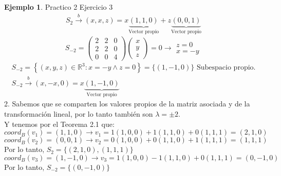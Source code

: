 \documentclass[10pt]{article}
\theoremstyle{definition}
\newtheorem{example}{Ejemplo}[section]
\begin{document}
\begin{example}{Practico 2 Ejercicio 3}
$$\begin{array}{l}
			S_{2}\xrightarrow{b}( x,x,z) =x\underbrace{( 1,1,0)}_{\text{Vector propio}} +z\underbrace{( 0,0,1)}_{\text{Vector propio}}
		\end{array}$$
	$$S_{-2} =\begin{pmatrix}
			2 & 2 & 0 \\
			2 & 2 & 0 \\
			0 & 0 & 4
		\end{pmatrix}\begin{pmatrix}
			x \\
			y \\
			z
		\end{pmatrix} =0\rightarrow \begin{matrix}
			z=0 \\
			x=-y
		\end{matrix}$$
	$$ \begin{array}{l}
			S_{-2} =\left\{( x,y,z) \in \mathbb{R}^{3}  : x=-y\land z=0\right\}=\{\left( 1,-1,0 \right) \} \text{ Subespacio propio.} \\
			S_{-2}\xrightarrow{b}( x,-x,0) =x\underbrace{( 1,-1,0)}_{\text{Vector propio}}
		\end{array}$$
	2. Sabemos que se comparten los valores propios de la matriz asociada y de la transformación lineal, por lo tanto también son $\lambda =\pm 2$.\\
	Y tenemos por el Teorema 2.1 que:\\
	$coord_B(v_1)=\left( 1,1,0 \right) \rightarrow v_1=1\left( 1,0,0 \right) + 1(1,1,0)+0\left( 1,1,1 \right)=(2,1,0)  $\\
	$coord_B(v_2)=(0,0,1)\rightarrow v_2=0(1,0,0)+0(1,1,0)+1(1,1,1)=(1,1,1) $\\
	Por lo tanto, $S_2=\{(2,1,0),(1,1,1)\}$\\
	$coord_B(v_3)=\left( 1,-1,0 \right)\rightarrow v_3=1(1,0,0)-1(1,1,0)+0(1,1,1)=(0,-1,0) $\\
	Por lo tanto, $S_{-2}=\{(0,-1,0)\}$
\end{example}\newpage
\end{document}
